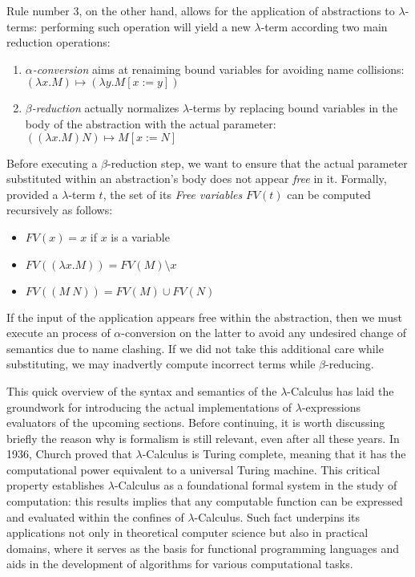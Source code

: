 \documentclass{article}
\begin{document}
Rule number 3, on the other hand, allows for the application of abstractions to $\lambda$-terms: performing such operation will yield a new $\lambda$-term according two main reduction operations:

\begin{enumerate}
    \item \textit{$\alpha$-conversion} aims at renaiming bound variables for avoiding name collisions: $(\lambda x . M) \mapsto (\lambda y . M[x := y])$
    \item \textit{$\beta$-reduction} actually normalizes $\lambda$-terms by replacing bound variables in the body of the abstraction with the actual parameter: $((\lambda x . M) N) \mapsto M[x := N]$
\end{enumerate}

Before executing a $\beta$-reduction step, we want to ensure that the actual parameter substituted within an abstraction's body does not appear \textit{free} in it. Formally, provided a $\lambda$-term $t$, the set of its \textit{Free variables} $FV(t)$ can be computed recursively as follows:

\begin{itemize}
    \item $FV(x) = x$ if $x$ is a variable
    \item $FV((\lambda x . M)) = FV(M) \setminus x$
    \item $FV((M\ N)) = FV(M) \cup FV(N)$
\end{itemize}

If the input of the application appears free within the abstraction, then we must execute an process of $\alpha$-conversion on the latter to avoid any undesired change of semantics due to name clashing. If we did not take this additional care while substituting, we may inadvertly compute incorrect terms while $\beta$-reducing.

This quick overview of the syntax and semantics of the $\lambda$-Calculus has laid the groundwork for introducing the actual implementations of $\lambda$-expressions evaluators of the upcoming sections. Before continuing, it is worth discussing briefly the reason why is formalism is still relevant, even after all these years. In 1936, Church proved that $\lambda$-Calculus is Turing complete, meaning that it has the computational power equivalent to a universal Turing machine. This critical property establishes $\lambda$-Calculus as a foundational formal system in the study of computation: this results implies that any computable function can be expressed and evaluated within the confines of $\lambda$-Calculus. Such fact underpins its applications not only in theoretical computer science but also in practical domains, where it serves as the basis for functional programming languages and aids in the development of algorithms for various computational tasks.
\end{document}

